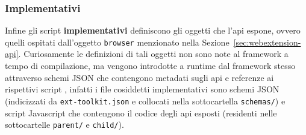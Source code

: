 \documentclass{sapthesis}
\newcommand{\bold}[1]{\textbf{#1}}
\newcommand{\code}[1]{\texttt{#1}}
\newcommand{\file}[1]{\code{#1}}
\newcommand{\Sezione}[1]{Sezione~\ref{#1}}
\newcommand{\JS}{Javascript}
\newcommand{\json}{JSON}
\begin{document}
        \subsubsection{Implementativi}
        Infine gli script \bold{implementativi} definiscono gli oggetti che l'api espone, ovvero quelli ospitati
        dall'oggetto \code{browser} menzionato nella \Sezione{sec:webextension-api}. Curiosamente le definizioni di tali
        oggetti non sono note al framework a tempo di compilazione, ma vengono introdotte a runtime dal framework stesso attraverso
        schemi \json{} che contengono metadati sugli api e referenze ai rispettivi script \cite{webextension-api-development}, infatti i file cosiddetti implementativi
        sono schemi \json{} (indicizzati da \file{ext-toolkit.json} e collocati nella sottocartella \file{schemas/}) e script \JS{}
        che contengono il codice degli api esposti (residenti nelle sottocartelle \file{parent/} e \file{child/}).
\end{document}
